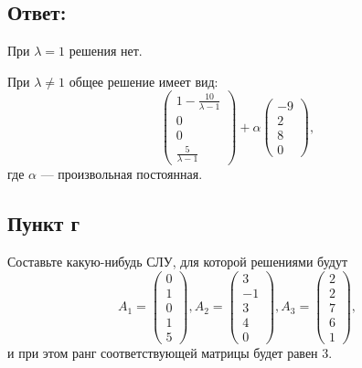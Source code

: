 \documentclass[12pt]{article}
\begin{document}
    \subsection*{Ответ:}
    При $\lambda = 1$ решения нет.

    При $\lambda \neq 1$ общее решение имеет вид:
    \[
        \begin{pmatrix}
            1 - \frac{10}{\lambda - 1} \\
            0                          \\
            0                          \\
            \frac{5}{\lambda - 1}
        \end{pmatrix}
        + \alpha
        \begin{pmatrix}
            - 9 \\ 2 \\ 8 \\ 0
        \end{pmatrix}
        ,
    \]
    где $\alpha$ --- произвольная постоянная.

    \subsection*{Пункт г}
    Составьте какую-нибудь СЛУ, для которой решениями будут
    \[
        A_1 =
        \begin{pmatrix}
            0 \\ 1 \\ 0 \\ 1 \\ 5
        \end{pmatrix},
        A_2 =
        \begin{pmatrix}
            3 \\ -1 \\ 3 \\ 4 \\ 0
        \end{pmatrix},
        A_3 =
        \begin{pmatrix}
            2 \\ 2 \\ 7 \\ 6 \\ 1
        \end{pmatrix},
    \]
    и при этом ранг соответствующей матрицы будет равен 3.
\end{document}
